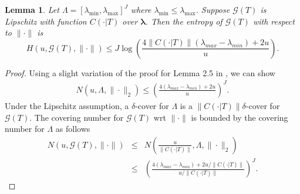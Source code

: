 \documentclass[10pt]{book}
\newtheorem{lemma}{Lemma}
\theoremstyle{definition}
\begin{document}
\begin{lemma}
	\label{lemma:covering_cube}
	Let $\Lambda = [\lambda_{\min}, \lambda_{\max}]^J$ where $\lambda_{\min} \le \lambda_{\max}$. Suppose $\mathcal{G}(T)$ is Lipschitz with function $C(\cdot | T)$ over $\boldsymbol{\lambda}$.
	Then the entropy of $\mathcal{G}(T)$ with respect to $\| \cdot \|$ is
	\begin{equation}
	H\left(u, \mathcal{G}(T),\|\cdot\|\right) \le
	J \log \left(\frac{4 \|C(\cdot | T)\| \left(\lambda_{max}-\lambda_{min}\right)+2u}{u}\right).
	\end{equation}
\end{lemma}
\begin{proof}
	Using a slight variation of the proof for Lemma 2.5 in \citet{van2000empirical}, we can show
	\begin{align}
	N\left(u,\Lambda,\|\cdot\|_{2}\right) \le \left(\frac{4\left(\lambda_{max}-\lambda_{min}\right)+2u}{u}\right)^{J}.
	\end{align}
	Under the Lipschitz assumption, a $\delta$-cover for $\Lambda$
	is a $\|C(\cdot | T)\|\delta$-cover for $\mathcal{G}(T)$. The covering number for $\mathcal{G}(T)$ wrt $\|\cdot\|$ is bounded by the covering number for $\Lambda$ as follows
	\begin{eqnarray}
	N\left(u,\mathcal{G}(T),\|\cdot\|\right)
	&\le& N\left(\frac{u}{\|C(\cdot | T)\|},\Lambda,\|\cdot\|_{2}\right)\\
	&\le& \left(\frac{4\left(\lambda_{max}-\lambda_{min}\right)+2u/\|C(\cdot | T)\|}{u/\|C(\cdot | T)\|}\right)^{J}.
	\end{eqnarray}
\end{proof}
\end{document}
